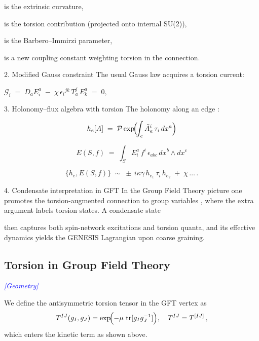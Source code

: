 \documentclass{article}
\DeclareMathOperator{\tr}{tr}
\newcommand{\geometrytag}{\textcolor{blue}{\textit{[Geometry]}}}
\begin{document}
 is the extrinsic curvature,

 is the torsion contribution (projected onto internal SU(2)),

 is the Barbero–Immirzi parameter,

 is a new coupling constant weighting torsion in the connection.


2. Modified Gauss constraint
The usual Gauss law  acquires a torsion current:



$\mathcal{G}_i \;=\; D_a E^a_i \;-\; \chi\,\epsilon_{i}{}^{jk}\,T^j_a\,E^a_k \;=\; 0,$

3. Holonomy–flux algebra with torsion
The holonomy along an edge :



\begin{equation}\label{eq:auto101}
h_e[A] \;=\; \mathcal P\exp\!\Bigl(\!\int_e \tilde A^i_a\,\tau_i\,dx^a\Bigr)
\end{equation}

\begin{equation}\label{eq:auto102}
E(S,f) \;=\; \int_S E_i^a\,f^i\,\epsilon_{abc}\,dx^b\wedge dx^c
\end{equation}

\begin{equation}\label{eq:auto103}
\{h_e, E(S,f)\}
  \;\sim\;
  \pm\,i\kappa\gamma\,
  h_{e_1}\,\tau_i\,h_{e_2}
  \;+\;
  \chi\,\ldots\,.
\end{equation}

4. Condensate interpretation in GFT
In the Group Field Theory picture one promotes the torsion-augmented connection  to group variables , where the extra argument  labels torsion states.  A condensate state

then captures both spin-network excitations and torsion quanta, and its effective dynamics yields the GENESIS Lagrangian upon coarse graining.


\subsection{Torsion in Group Field Theory}
\geometrytag


We define the antisymmetric torsion tensor in the GFT vertex as
\begin{equation}\label{eq:auto104}
T^{IJ}(g_I,g_J)
  = \exp\!\Bigl(-\mu\,\tr[g_Ig_J^{-1}]\Bigr),
  \quad T^{IJ}=T^{[IJ]}\,,
\end{equation}
which enters the kinetic term as shown above.
\end{document}
